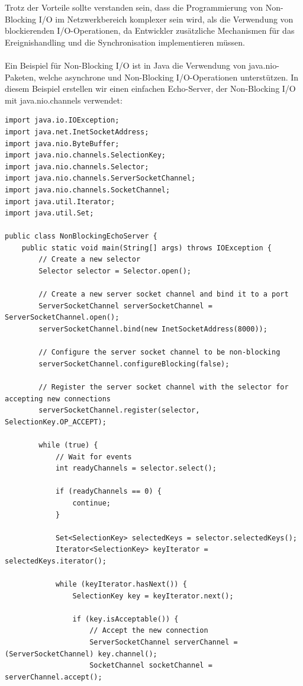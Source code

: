 \documentclass[../vs-script-first-v01.tex]{subfiles}
\begin{document}
Trotz der Vorteile sollte verstanden sein, dass die Programmierung von Non-Blocking I/O im Netzwerkbereich komplexer sein wird, als die Verwendung von blockierenden I/O-Operationen, da Entwickler zusätzliche Mechanismen für das Ereignishandling und die Synchronisation implementieren müssen.
\\\\
Ein Beispiel für Non-Blocking I/O ist in Java die Verwendung von java.nio-Paketen, welche asynchrone und Non-Blocking I/O-Operationen unterstützen. In diesem Beispiel erstellen wir einen einfachen Echo-Server, der Non-Blocking I/O mit java.nio.channels verwendet:

\begin{lstlisting}[caption={Non-Blocking},captionpos=b,label={lst:nonb}]
import java.io.IOException;
import java.net.InetSocketAddress;
import java.nio.ByteBuffer;
import java.nio.channels.SelectionKey;
import java.nio.channels.Selector;
import java.nio.channels.ServerSocketChannel;
import java.nio.channels.SocketChannel;
import java.util.Iterator;
import java.util.Set;

public class NonBlockingEchoServer {
    public static void main(String[] args) throws IOException {
        // Create a new selector
        Selector selector = Selector.open();

        // Create a new server socket channel and bind it to a port
        ServerSocketChannel serverSocketChannel = ServerSocketChannel.open();
        serverSocketChannel.bind(new InetSocketAddress(8000));

        // Configure the server socket channel to be non-blocking
        serverSocketChannel.configureBlocking(false);

        // Register the server socket channel with the selector for accepting new connections
        serverSocketChannel.register(selector, SelectionKey.OP_ACCEPT);

        while (true) {
            // Wait for events
            int readyChannels = selector.select();

            if (readyChannels == 0) {
                continue;
            }

            Set<SelectionKey> selectedKeys = selector.selectedKeys();
            Iterator<SelectionKey> keyIterator = selectedKeys.iterator();

            while (keyIterator.hasNext()) {
                SelectionKey key = keyIterator.next();

                if (key.isAcceptable()) {
                    // Accept the new connection
                    ServerSocketChannel serverChannel = (ServerSocketChannel) key.channel();
                    SocketChannel socketChannel = serverChannel.accept();


\end{lstlisting}
\end{document}
